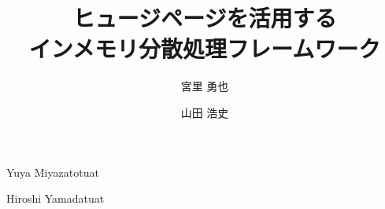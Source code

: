 \documentclass[submit,techrep,noauthor]{ipsj}
\begin{document}
\title{ヒュージページを活用する\\インメモリ分散処理フレームワーク}


\author{宮里 勇也}{Yuya Miyazato}{tuat}
\author{山田 浩史}{Hiroshi Yamada}{tuat}




\maketitle











\end{document}
